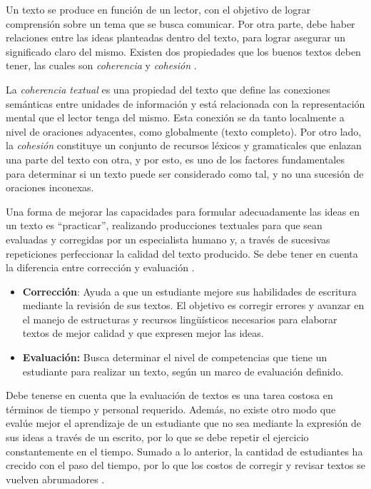 \documentclass[12pt]{diicc}
\begin{document}
Un texto se produce en función de un lector, con el objetivo de lograr comprensión sobre un tema que se busca comunicar. Por otra parte, debe haber relaciones entre las ideas planteadas dentro del texto, para lograr asegurar un significado claro del mismo. Existen dos propiedades que los buenos textos deben tener, las cuales son {\em coherencia} y {\em cohesión} \cite{t32}.

La {\em coherencia textual} es una propiedad del texto que define las conexiones semánticas entre unidades de información y está relacionada con la representación mental que el lector tenga del mismo. Esta conexión se da tanto localmente a nivel de oraciones adyacentes, como globalmente (texto completo). Por otro lado, la {\em cohesión} constituye un conjunto de recursos léxicos y gramaticales que enlazan una parte del texto con otra, y por esto, es uno de los factores fundamentales para determinar si un texto puede ser considerado como tal, y no una sucesión de oraciones inconexas.

Una forma de mejorar las capacidades para formular adecuadamente las ideas en un texto es ``practicar'', realizando producciones textuales para que sean evaluadas y corregidas por un especialista humano y, a través de sucesivas repeticiones perfeccionar la calidad del texto producido. Se debe tener en cuenta la diferencia entre corrección y evaluación \cite{t18}.

\begin{itemize}
	\item {\bf Corrección}: Ayuda a que un estudiante mejore sus habilidades de escritura mediante la revisión de sus textos. El objetivo es corregir errores y avanzar en el manejo de estructuras y recursos lingüísticos necesarios para elaborar textos de mejor calidad y que expresen mejor las ideas.
	\item {\bf Evaluación:} Busca determinar el nivel de competencias que tiene un estudiante para realizar un texto, según un marco de evaluación definido.
\end{itemize}

Debe tenerse en cuenta que la evaluación de textos es una tarea costosa en términos de tiempo y personal requerido. Además, no existe otro modo que evalúe mejor el aprendizaje de un estudiante que no sea mediante la expresión de sus ideas a través de un escrito, por lo que se debe repetir el ejercicio constantemente en el tiempo. Sumado a lo anterior, la cantidad de estudiantes ha crecido con el paso del tiempo, por lo que los costos de corregir y revisar textos se vuelven abrumadores \cite{t10}.
\end{document}
